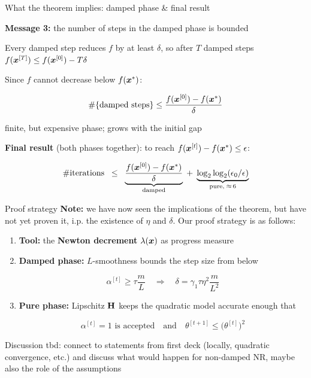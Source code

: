 \documentclass[11pt,compress,t,notes=noshow, xcolor=table]{beamer}
\begin{document}
\begin{framei}[fs=small]{What the theorem implies: damped phase \& final result}
\item \textbf{Message 3:} the number of steps in the damped phase is bounded
\begin{itemizeM}
\item Every damped step reduces $f$ by at least $\delta$, so after $T$ damped steps
$f(\bm{x}^{[T]}) \le f(\bm{x}^{[0]}) - T \delta$
\item Since $f$ cannot decrease below $f(\bm{x}^\ast)$:
\begin{framed}
$$\#\{\text{damped steps}\} \le \frac{f(\bm{x}^{[0]}) - f(\bm{x}^\ast)}{\delta}$$
\end{framed}
\item[$\Rightarrow$] finite, but expensive phase; grows with the initial gap
\end{itemizeM}
\item \textbf{Final result} (both phases together): to reach $f(\bm{x}^{[t]}) - f(\bm{x}^\ast) \le \epsilon$:
\begin{framed}
$$\#\text{iterations} \;\; \le \;\;
\underbrace{\frac{f(\bm{x}^{[0]}) - f(\bm{x}^\ast)}{\delta}}_{\text{damped}} \; + \;
\underbrace{\log_2 \log_2 (\epsilon_0/\epsilon)}_{\text{pure}, \; \approx \, 6}$$
\end{framed}
\end{framei}


\begin{framev}[fs=small]{Proof strategy}
\textbf{Note:} we have now seen the implications of the theorem, but have not yet proven it, i.p. the existence of $\eta$ and $\delta$. Our proof strategy is as follows:
\begin{enumerate}
\item \textbf{Tool:} the \textbf{Newton decrement} $\lambda(\bm{x})$ as progress measure
\item \textbf{Damped phase:} $L$-smoothness bounds the step size from below
\begin{framed}
$$\alpha^{[t]} \ge \tau \frac{m}{L}
\quad \Longrightarrow \quad
\delta = \gamma_1 \tau \eta^2 \frac{m}{L^2}$$
\end{framed}
\item \textbf{Pure phase:} Lipschitz $\mathbf{H}$ keeps the quadratic model accurate enough that
\begin{framed}
$$\alpha^{[t]} = 1 \text{ is accepted}
\quad \text{and} \quad
\theta^{[t+1]} \le \big( \theta^{[t]} \big)^2$$
\end{framed}
\end{enumerate}
\end{framev}


\begin{framev}[align=top]{Discussion}
  tbd: connect to statements from first deck (locally, quadratic convergence, etc.) and discuss what would happen for non-damped NR, maybe also the role of the assumptions
\end{framev}

\endlecture
\end{document}
